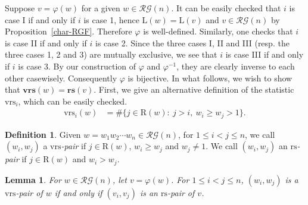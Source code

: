 \documentclass[12pt]{amsart}
\numberwithin{equation}{section}
\theoremstyle{plain}
\newtheorem{lemma}[theorem]{Lemma}
\theoremstyle{definition}
\newtheorem{Def}[theorem]{Definition}
\def\rs{\mathrm{rs}}
\def\wrs{\mathrm{vrs}}
\def\LL{\mathrm{L}}
\def\RR{\mathrm{R}}
\def\brs{\mathbf{rs}}
\def\bwrs{\mathbf{vrs}}
\def\RG{\mathcal{RG}}
\begin{document}
Suppose $v=\varphi(w)$ for a given $w\in\RG(n)$. It can be easily checked that $i$ is case I if and only if $i$ is case 1, hence $\LL(w)=\LL(v)$ and $v\in\RG(n)$ by Proposition~\ref{char-RGF}. Therefore $\varphi$ is well-defined. Similarly, one checks that $i$ is case II if and only if $i$ is case 2. Since the three cases I, II and III (resp. the three cases 1, 2 and 3) are mutually exclusive, we see that $i$ is case III if and only if $i$ is case 3. By our construction of $\varphi$ and $\varphi^{-1}$, they are clearly inverse to each other casewisely. Consequently $\varphi$ is bijective. In what follows, we wish to show that $\bwrs(w)=\brs(v)$.
First, we give an alternative definition of the statistic $\wrs_i$,
which can be easily checked.
\begin{align}\label{alter-vrs}
  \wrs_i(w) &=\#\{j \in \RR(w):~j>i,~ w_i \geq w_j >1 \}.
\end{align}

\begin{Def}
Given $w=w_1 w_2 \cdots w_n \in \RG(n)$, for $1 \leq i <j \leq n$, we call $(w_i,w_j)$
a \emph{$\wrs$-pair} if  $j \in \RR(w)$, $w_i \geq w_j $ and $ w_j \neq 1$. We call $(w_i,w_j)$ an \emph{$\rs$-pair} if
 $j \in \RR(w)$ and $w_i > w_j $.
\end{Def}


\begin{lemma}\label{vrs-rs-pair}
For $w\in\RG(n)$, let $v=\varphi(w)$. For $1 \leq i <j \leq n$,   $(w_i, w_j)$ is
a $\wrs$-pair of $w$ if and only if $(v_i,v_j)$ is an $\rs$-pair of
$v$.
\end{lemma}
\end{document}
